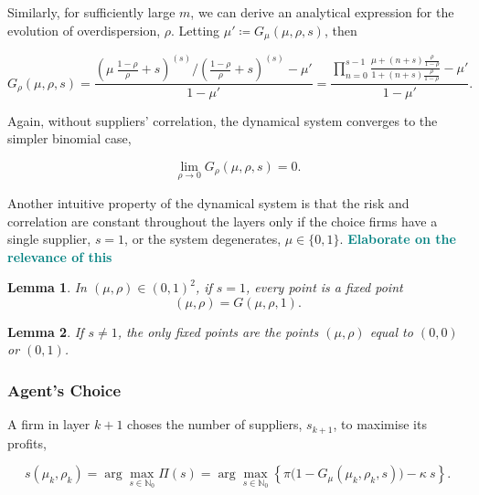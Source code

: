 \documentclass[draft, american, abstract=on]{scrartcl}
\theoremstyle{plain}
\newtheorem{lemma}{Lemma}
\newcommand\notes[1]{\textcolor{teal}{\footnotesize \textbf{#1}}}
\begin{document}
Similarly, for sufficiently large $m$, we can derive an analytical expression for the evolution of overdispersion, $\rho$. Letting $\mu' \coloneqq G_\mu(\mu, \rho, s)$, then

\begin{equation}
  G_\rho(\mu, \rho, s) = \frac{\left( \mu \  \frac{1 - \rho}{\rho} + s \right)^{(s)} \Big/ \left( \frac{1 - \rho}{\rho} + s \right)^{(s)} - \mu'}{1 - \mu'} = \frac{\prod^{s - 1}_{n = 0} \frac{\mu + (n + s) \frac{\rho}{1 - \rho}}{1 + (n + s) \frac{\rho}{1 - \rho}} - \mu'}{1 - \mu'}.
\end{equation}



Again, without suppliers' correlation, the dynamical system converges to the simpler binomial case,

\begin{equation}
  \lim_{\rho \rightarrow 0} G_\rho(\mu, \rho, s) = 0.
\end{equation}

Another intuitive property of the dynamical system is that the risk and correlation are constant throughout the layers only if the choice firms have a single supplier, $s = 1$, or the system degenerates, $\mu \in \{0, 1\}$. \notes{Elaborate on the relevance of this}

\begin{lemma}
  In $(\mu, \rho) \in (0, 1)^2$, if $s = 1$, every point is a fixed point \begin{equation}
    (\mu, \rho) = G(\mu, \rho, 1). 
  \end{equation}
\end{lemma}

\begin{lemma}
  If $s \neq 1$, the only fixed points are the points $(\mu, \rho)$ equal to $(0, 0)$  or $(0, 1)$.
\end{lemma}

\subsubsection{Agent's Choice}

A firm in layer $k + 1$ choses the number of suppliers, $s_{k + 1}$, to maximise its profits, 

\begin{equation}
  s(\mu_k, \rho_k) = \arg\max_{s \in \mathbb{N}_0} \Pi(s) = \arg\max_{s \in \mathbb{N}_0} \left\{ \pi \Big(1 - G_{\mu}(\mu_k, \rho_k, s)\Big) - \kappa \  s \right\}.
\end{equation}
\end{document}
